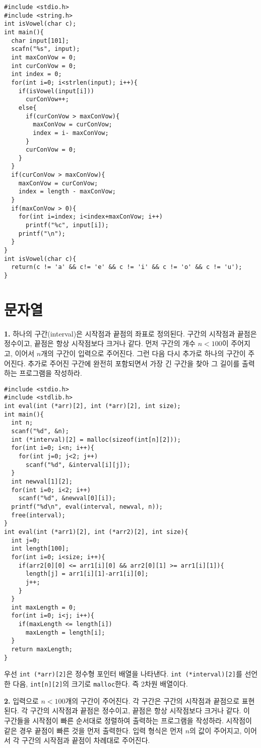 \documentclass[a4paper,chapter,atbegshi]{oblivoir}
\begin{document}
\begin{lstlisting}[style=C]
#include <stdio.h>
#include <string.h>
int isVowel(char c);
int main(){
  char input[101];
  scafn("%s", input);
  int maxConVow = 0;
  int curConVow = 0;
  int index = 0;
  for(int i=0; i<strlen(input); i++){
    if(isVowel(input[i]))
      curConVow++;
    else{
      if(curConVow > maxConVow){
        maxConVow = curConVow;
        index = i- maxConVow;
      }
      curConVow = 0;
    }
  }
  if(curConVow > maxConVow){
    maxConVow = curConVow;
    index = length - maxConVow;
  }
  if(maxConVow > 0){
    for(int i=index; i<index+maxConVow; i++)
      printf("%c", input[i]);
    printf("\n");
  }
}
int isVowel(char c){
  return(c != 'a' && c!= 'e' && c != 'i' && c != 'o' && c != 'u');
}
\end{lstlisting}
\chapter{문자열}
\begin{mdframed}\textbf{1. }
  하나의 구간(interval)은 시작점과 끝점의 좌표로 정의된다. 구간의 시작점과 끝점은
  정수이고, 끝점은 항상 시작점보다 크거나 같다. 먼저 구간의 개수 $n<100$이
  주어지고, 이어서 $n$개의 구간이 입력으로 주어진다. 그런 다음 다시 추가로 하나의
  구간이 주어진다. 추가로 주어진 구간에 완전히 포함되면서 가장 긴 구간을 찾아 그
  길이를 출력하는 프로그램을 작성하라.
\end{mdframed}
\begin{lstlisting}[style=C]
#include <stdio.h>
#include <stdlib.h>
int eval(int (*arr)[2], int (*arr)[2], int size);
int main(){
  int n;
  scanf("%d", &n);
  int (*interval)[2] = malloc(sizeof(int[n][2]));
  for(int i=0; i<n; i++){
    for(int j=0; j<2; j++)
      scanf("%d", &interval[i][j]);
  }
  int newval[1][2];
  for(int i=0; i<2; i++)
    scanf("%d", &newval[0][i]);
  printf("%d\n", eval(interval, newval, n));
  free(interval);
}
int eval(int (*arr1)[2], int (*arr2)[2], int size){
  int j=0;
  int length[100];
  for(int i=0; i<size; i++){
    if(arr2[0][0] <= arr1[i][0] && arr2[0][1] >= arr1[i][1]){
      length[j] = arr1[i][1]-arr1[i][0];
      j++;
    }
  }
  int maxLength = 0;
  for(int i=0; i<j; i++){
    if(maxLength <= length[i])
      maxLength = length[i];
  }
  return maxLength;
}
\end{lstlisting}
우선 \texttt{int (*arr)[2]}은 정수형 포인터 배열을 나타낸다. 
\texttt{int (*interval)[2]}를 선언한 다음, \texttt{int[n][2]}의 크기로
\texttt{malloc}한다. 즉 2차원 배열이다.
\hfill\break
\begin{mdframed}\textbf{2. }
  입력으로 $n<100$개의 구간이 주어진다. 각 구간은 구간의 시작점과 끝점으로
  표현된다. 각 구간의 시작점과 끝점은 정수이고, 끝점은 항상 시작점보다 크거나
  같다. 이 구간들을 시작점이 빠른 순서대로 정렬하여 출력하는 프로그램을
  작성하라. 시작점이 같은 경우 끝점이 빠른 것을 먼저 출력한다. 입력 형식은 
  먼저 $n$의 값이 주어지고, 이어서 각 구간의 시작점과 끝점이 차례대로 주어진다.
\end{mdframed}
\end{document}
